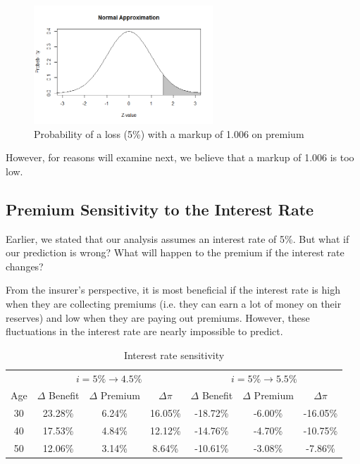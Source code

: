 \documentclass[12pt]{article}
\begin{document}
\begin{figure}[!ht]
\begin{center}
\includegraphics[width=0.6\textwidth]{images/normalPlot2}
\end{center}
\vspace{-5mm}
\caption{Probability of a loss (5\%) with a markup of 1.006 on premium}
\end{figure}

However, for reasons will examine next, we believe that a markup of 1.006 is too low.

\subsection{Premium Sensitivity to the Interest Rate}

Earlier, we stated that our analysis assumes an interest rate of 5\%. But what if our prediction is  wrong? What will happen to the premium if the interest rate changes?

From the insurer's perspective, it is most beneficial if the interest rate is high when they are collecting premiums (i.e. they can earn a lot of money on their reserves) and low when they are paying out premiums. However, these fluctuations in the interest rate are nearly impossible to predict.

\begin{table}[!ht]
\centering
\begin{tabular}{|c|ccc|ccc|}
\hline
& \multicolumn{3}{c}{$i = 5\% \to 4.5\%$} & \multicolumn{3}{|c|}{$i = 5\% \to 5.5\%$} \\
Age & $\Delta$ Benefit & $\Delta$ Premium & $\Delta \pi$ & $\Delta$ Benefit & $\Delta$ Premium & $\Delta \pi$ \\ [0.5ex]
\hline  
30 & 23.28\% & 6.24\% & 16.05\% & -18.72\% & -6.00\% & -16.05\% \\
40 & 17.53\% & 4.84\% & 12.12\% & -14.76\% & -4.70\% & -10.75\% \\
50 & 12.06\% & 3.14\%  & 8.64\% & -10.61\% & -3.08\%  & -7.86\% \\
\hline  
\end{tabular} 
\caption{Interest rate sensitivity}
\end{table}
\end{document}
